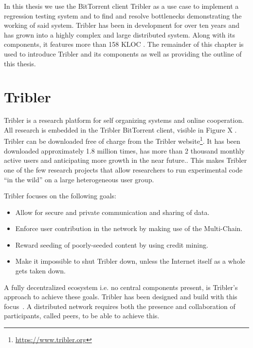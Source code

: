 In this thesis we use the BitTorrent client Tribler as a use case to implement a regression testing system and to find and resolve bottlenecks demonstrating the working of said system.
Tribler has been in development for over ten years and has grown into a highly complex and large distributed system.
Along with its components, it features more than 158 KLOC \cite{tribler2015about}.
The remainder of this chapter is used to introduce Tribler and its components as well as providing the outline of this thesis.

\section{Tribler}
Tribler is a research platform for self organizing systems and online cooperation.
All research is embedded in the Tribler BitTorrent client, visible in Figure X .
Tribler can be downloaded free of charge from the Tribler website\footnote{\url{https://www.tribler.org}}.
It has been downloaded approximately 1.8 million times, has more than 2 thousand monthly active users and anticipating more growth in the near future..
This makes Tribler one of the few research projects that allow researchers to run experimental code ``in the wild'' on a large heterogeneous user group.

Tribler focuses on the following goals:
\begin{itemize}
    \item Allow for secure and private communication and sharing of data.
    \item Enforce user contribution in the network by making use of the Multi-Chain.
    \item Reward seeding of poorly-seeded content by using credit mining.
    \item Make it impossible to shut Tribler down, unless the Internet itself as a whole gets taken down.
\end{itemize}

A fully decentralized ecosystem i.e. no central components present, is Tribler's approach to achieve these goals.
Tribler has been designed and build with this focus~\cite{Pouwelse-tribler,Bakker-tribler}.
A distributed network requires both the presence and collaboration of participants, called peers, to be able to achieve this.


